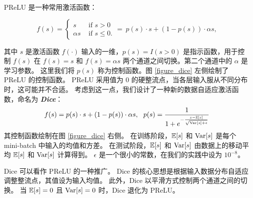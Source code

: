 


PReLU \cite{ms:prelu} 是一种常用激活函数：
\begin{small}
\begin{equation}
f(s) = \begin{cases}
       s & \text{ if } s > 0  \\
       \alpha s & \text{ if } s \leq 0.
       \end{cases}
     = ~ p(s) \cdot s + (1-p(s))\cdot \alpha s,   
\end{equation}
\end{small}
其中 $s$ 是激活函数 $f(\cdot)$ 输入的一维，$p(s) = I(s>0)$ 是指示函数，用于控制 $f(s)$ 在 $f(s)=s$ 和 $f(s)=\alpha s$ 两个通道之间切换。第二个通道中的 $\alpha$ 是学习参数。
这里我们将 $p(s)$ 称为控制函数。图 \ref{figure_dice} 左侧绘制了 PReLU 的控制函数。
PReLU 采用值为 $0$ 的硬整流点，当各层输入服从不同分布时，这可能并不合适。
考虑到这一点，我们设计了一种新的数据自适应激活函数，命名为 \textsl{\textbf{Dice}}：
\begin{equation}
f(s) = p(s) \cdot s + (1-p(s))\cdot \alpha s, \ \ p(s) = \frac{1}{ 1 + e^{- \frac{s - \mathbb{E}[s]}{\sqrt{\mathrm{Var}[s] + \epsilon}}}}
\end{equation}
其控制函数绘制在图 \ref{figure_dice} 右侧。
在训练阶段，$\mathbb{E}[s]$ 和 $\mathrm{Var}[s]$ 是每个 mini-batch 中输入的均值和方差。
在测试阶段，$\mathbb{E}[s]$ 和 $\mathrm{Var}[s]$ 由数据上的移动平均 $\mathbb{E}[s]$ 和 $\mathrm{Var}[s]$ 计算得到。
$\epsilon$ 是一个很小的常数，在我们的实践中设为 $10^{-8}$。

Dice 可以看作 PReLU 的一种推广。
Dice 的核心思想是根据输入数据分布自适应调整整流点，其值设为输入均值。
此外，Dice 以平滑方式控制两个通道之间的切换。
当 $\mathbb{E}[s]=0$ 且 $\mathrm{Var}[s]=0$ 时，Dice 退化为 PReLU。




